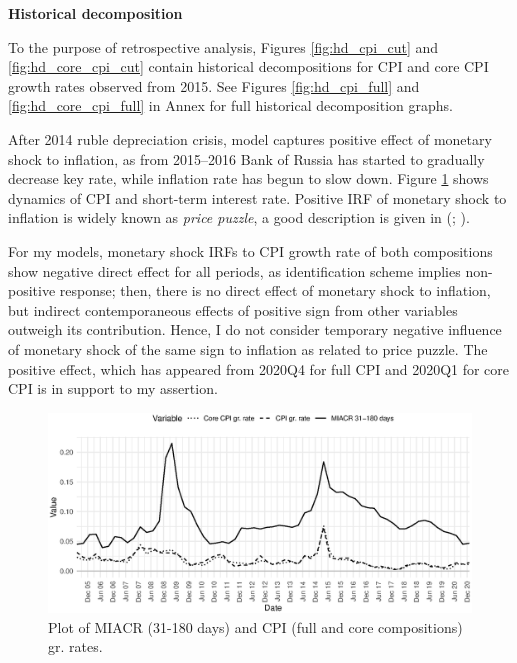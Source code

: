 \documentclass[12pt, a4paper]{extarticle}
\begin{document}
\begin{center}
	\textbf{Historical decomposition}
\end{center}

To the purpose of retrospective analysis, Figures \ref{fig:hd_cpi_cut} and \ref{fig:hd_core_cpi_cut} contain historical decompositions for CPI and core CPI growth rates observed from 2015. See Figures \ref{fig:hd_cpi_full} and \ref{fig:hd_core_cpi_full} in Annex for full historical decomposition graphs.

After 2014 ruble depreciation crisis, model captures positive effect of monetary shock to inflation, as from 2015--2016 Bank of Russia has started to gradually decrease key rate, while inflation rate has begun to slow down. Figure \ref{fig:intrate_cpi} shows dynamics of CPI and short-term interest rate. Positive IRF of monetary shock to inflation is widely known as \textit{price puzzle}, a good description is given in (\cite{Sims1992}; \cite{Christiano1994}). 

For my models, monetary shock IRFs to CPI growth rate of both compositions show negative direct effect for all periods, as identification scheme implies non-positive response; then, there is no direct effect of monetary shock to inflation, but indirect contemporaneous effects of positive sign from other variables outweigh its contribution. Hence, I do not consider temporary negative influence of monetary shock of the same sign to inflation as related to price puzzle. The positive effect, which has appeared from 2020Q4 for full CPI and 2020Q1 for core CPI is in support to my assertion.

\begin{figure}[h!]
	\centering
	\includegraphics[width=1\linewidth]{figures/intrate_cpi}
	\caption[]{Plot of MIACR (31-180 days) and CPI (full and core compositions) gr. rates.}
	\label{fig:intrate_cpi}
\end{figure}
\end{document}
